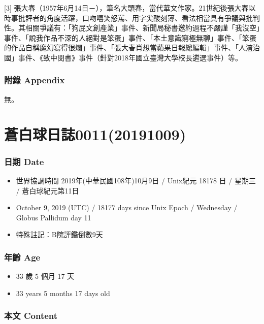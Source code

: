 \documentclass[a5paper, 12pt
]{book}
\providecommand{\tightlist}{%
  \setlength{\itemsep}{0pt}\setlength{\parskip}{0pt}}
\begin{document}
{[}3{]}
張大春（1957年6月14日－），筆名大頭春，當代華文作家。21世紀後張大春以時事批評者的角度活躍，口吻嘻笑怒罵、用字尖酸刻薄、看法相當具有爭議與批判性。其相關爭議有：「狗屁文創產業」事件、新聞局秘書邀約過程不嚴謹「我沒空」事件、「說我作品不深的人絕對是笨蛋」事件、「本土意識窮極無聊」事件、「笨蛋的作品自稱魔幻寫得很爛」事件、「張大春肖想當蘋果日報總編輯」事件、「人渣治國」事件、《致中閔書》事件（針對2018年國立臺灣大學校長遴選事件）等。

\hypertarget{ux9644ux9304-appendix-3}{%
\subsubsection{附錄 Appendix}\label{ux9644ux9304-appendix-3}}

無。

\hypertarget{ux84bcux767dux7403ux65e5ux8a8c001120191009}{%
\section{蒼白球日誌0011(20191009)}\label{ux84bcux767dux7403ux65e5ux8a8c001120191009}}

\hypertarget{ux65e5ux671f-date-8}{%
\subsubsection{日期 Date}\label{ux65e5ux671f-date-8}}

\begin{itemize}
\tightlist
\item
  世界協調時間 2019年(中華民國108年)10月9日 / Unix紀元 18178 日 / 星期三
  / 蒼白球紀元第11日
\item
  October 9, 2019 (UTC) / 18177 days since Unix Epoch / Wednesday /
  Globus Pallidum day 11
\item
  特殊註記：B院評鑑倒數9天
\end{itemize}

\hypertarget{ux5e74ux9f61-age-8}{%
\subsubsection{年齡 Age}\label{ux5e74ux9f61-age-8}}

\begin{itemize}
\tightlist
\item
  33 歲 5 個月 17 天
\item
  33 years 5 months 17 days old
\end{itemize}

\hypertarget{ux672cux6587-content-8}{%
\subsubsection{本文 Content}\label{ux672cux6587-content-8}}
\end{document}
